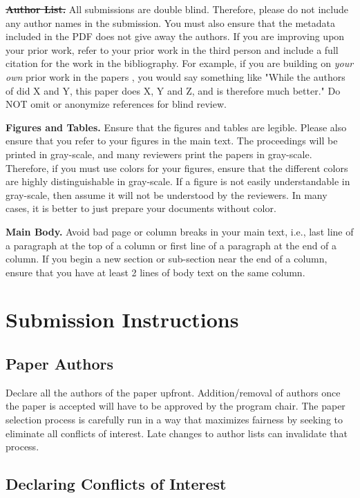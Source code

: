 \noindent\textbf{\sout{Author List.}} All submissions are double
blind. Therefore, please do not include any author names in the
submission. You must also ensure that the metadata included in the
PDF does not give away the authors. If you are improving upon your
prior work, refer to your prior work in the third person and include
a full citation for the work in the bibliography. For example, if
you are building on {\em your own} prior work in the papers \cite{nicepaper,nicepaper2}, 
you would say something like "While the authors of \cite{nicepaper,nicepaper2} did X and Y,
this paper does X, Y and Z, and is therefore much better."  Do NOT omit or
anonymize references for blind review.

\noindent\textbf{Figures and Tables.} Ensure that the figures and
tables are legible.  Please also ensure that you refer to your
figures in the main text. The proceedings will be printed in
gray-scale, and many reviewers print the papers in
gray-scale. Therefore, if you must use colors for your figures, ensure
that the different colors are highly distinguishable in gray-scale.
If a figure is not easily understandable in gray-scale, then assume
it will not be understood by the reviewers.  In many cases, it
is better to just prepare your documents without color.

\noindent\textbf{Main Body.} Avoid bad page or column breaks in
your main text, i.e., last line of a paragraph at the top of a
column or first line of a paragraph at the end of a column. If you
begin a new section or sub-section near the end of a column,
ensure that you have at least 2 lines of body text on the same
column. 

\section{Submission Instructions}

\subsection{Paper Authors}

Declare all the authors of the paper upfront. Addition/removal of authors once
the paper is accepted will have to be approved by the program chair.  The
paper selection process is carefully run in a way that maximizes fairness
by seeking to eliminate all conflicts of interest.  Late changes to author 
lists can invalidate that process.

\subsection{Declaring Conflicts of Interest}

